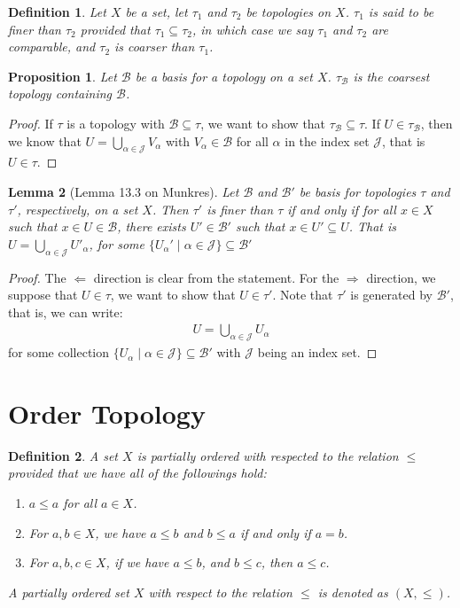 \documentclass[11pt]{book}
\theoremstyle{break}
\theoremstyle{break}
\newtheorem{lem}{Lemma}[thm]
\newtheorem{prop}[lem]{Proposition}
\newtheorem{defn}{Definition}[corL]
\begin{document}
\begin{defn}
Let $X$ be a set, let $\tau_1$ and $\tau_2$ be topologies on $X$. $\tau_1$ is said to be finer than $\tau_2$ provided that $\tau_1 \subseteq \tau_2$, in which case we say $\tau_1$ and $\tau_2$ are comparable, and $\tau_2$ is coarser than $\tau_1$. 
\end{defn}

\begin{prop}
Let $\mathcal{B}$ be a basis for a topology on a set $X$. $\tau_{\mathcal{B}}$ is the coarsest topology containing $\mathcal{B}$.
\end{prop}
\begin{proof}
If $\tau$ is a topology with $\mathcal{B} \subseteq \tau$, we want to show that $\tau_{\mathcal{B}} \subseteq \tau$. If $U \in \tau_{\mathcal{B}}$, then we know that $U = \bigcup_{\alpha \in \mathcal{J}}V_\alpha$ with $V_\alpha \in \mathcal{B}$ for all $\alpha$ in the index set $\mathcal{J}$, that is $U \in \tau$. 
\end{proof}

\begin{lem}[Lemma 13.3 on Munkres]
Let $\mathcal{B}$ and $\mathcal{B}'$ be basis for topologies $\tau$ and $\tau'$, respectively, on a set $X$. Then $\tau'$ is finer than $\tau$ if and only if for all $x \in X$ such that $x \in U\in \mathcal{B}$, there exists $U' \in \mathcal{B'}$ such that $x \in U' \subseteq U$. That is $U = \bigcup_{\alpha \in \mathcal{J}}U'_{\alpha}$, for some $\{ U_\alpha' \mid \alpha \in \mathcal{J}\}\subseteq \mathcal{B}'$
\end{lem}
\begin{proof}
The $\Leftarrow$ direction is clear from the statement. For the $\Rightarrow$ direction, we suppose that $U \in \tau$, we want to show that $U \in \tau'$. Note that $\tau'$ is generated by $\mathcal{B}'$, that is, we can write:
\begin{align*}
U = \bigcup_{\alpha \in \mathcal{J}} U_\alpha
\end{align*}
for some collection $\{ U_{\alpha}\mid \alpha \in \mathcal{J}\} \subseteq \mathcal{B}'$ with $\mathcal{J}$ being an index set.
\end{proof}


\newpage
\section[Order Topology]{\color{red}Order Topology\color{black}}
\begin{defn}
A set $X$ is partially ordered with respected to the relation $\leq$ provided that we have all of the followings hold:
\begin{enumerate}[topsep=3pt,itemsep=-1ex,partopsep=1ex,parsep=1ex]
\item $a\leq a$ for all $a \in X$.
\item For $a,b \in X$, we have $a\leq b$ and $b \leq a$ if and only if $a= b$.
\item For $a,b,c \in X$, if we have $a\leq b$, and $b\leq c$, then $a\leq c$.
\end{enumerate}
A partially ordered set $X$ with respect to the relation $\leq$ is denoted as $(X,\leq)$.
\end{defn}
\end{document}
